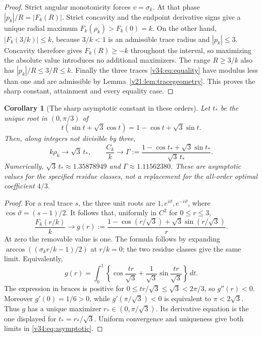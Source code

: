 \documentclass[UTF8,11pt]{ctexart}
\newtheorem{cor}[thm]{Corollary}
\theoremstyle{definition}
\numberwithin{equation}{section}
\begin{document}
\begin{proof}
Strict angular monotonicity forces $v=\sigma_k$. At that
phase $|p_k|/R=|F_k(R)|$. Strict concavity and the endpoint
derivative signs give a unique radial maximum
$F_k(\rho_k)>F_k(0)=k$. On the other hand,
$|F_k(3/k)|\le k$, because $3/k<1$ is an admissible trace
radius and $|p_k|\le3$. Concavity therefore gives
$F_k(R)\ge-k$ throughout the interval, so maximizing the
absolute value introduces no additional maximizers.
The range $R\ge3/k$ also has $|p_k|/R\le3/R\le k$.
Finally the three traces \eqref{v34:eq:equality} have modulus
less than one and are admissible by
Lemma~\ref{v21:lem:tracegeometry}. This proves the sharp
constant, attainment and every equality case.
\end{proof}

\begin{cor}[The sharp asymptotic constant in these orders]
\label{v34:cor:asymptotic}
Let $t_*$ be the unique root in $(0,\pi/3)$ of
\[
 t(\sin t+\sqrt3\cos t)=1-\cos t+\sqrt3\sin t.
\]
Then, along integers not divisible by three,
\begin{equation}\label{v34:eq:asymptotic}
 k\rho_k\longrightarrow\sqrt3\,t_*,\qquad
 \frac{C_k}{k}\longrightarrow
 \Gamma:=\frac{1-\cos t_*+\sqrt3\sin t_*}{\sqrt3\,t_*}.
\end{equation}
Numerically, $\sqrt3\,t_*\approx1.35878949$ and
$\Gamma\approx1.11562380$. These are asymptotic values for
the specified residue classes, not a replacement for the
all-order optimal coefficient $4/3$.
\end{cor}
\begin{proof}
For a real trace $s$, the three unit roots are
$1,e^{i\vartheta},e^{-i\vartheta}$, where
$\cos\vartheta=(s-1)/2$. It follows that, uniformly in
$C^2$ for $0\le r\le3$,
\[
 \frac{F_k(r/k)}k\longrightarrow
 g(r):=\frac{1-\cos(r/\sqrt3)+\sqrt3\sin(r/\sqrt3)}r.
\]
At zero the removable value is one. The formula follows
by expanding $\arccos((\sigma_kr/k-1)/2)$ at $r/k=0$;
the two residue classes give the same limit.
Equivalently,
\[
 g(r)=\int_0^1
 \left\{\cos\frac{tr}{\sqrt3}
       +\frac1{\sqrt3}\sin\frac{tr}{\sqrt3}\right\}\,dt.
\]
The expression in braces is positive for
$0\le tr/\sqrt3\le\sqrt3<2\pi/3$, so $g''(r)<0$.
Moreover $g'(0)=1/6>0$, while
$g'(\pi/\sqrt3)<0$ is equivalent to $\pi<2\sqrt3$.
Thus $g$ has a unique maximizer $r_*\in(0,\pi/\sqrt3)$.
Its derivative equation is the one displayed for
$t_*=r_*/\sqrt3$. Uniform convergence and uniqueness give
both limits in \eqref{v34:eq:asymptotic}.
\end{proof}
\end{document}
